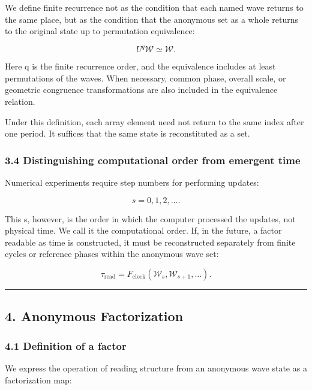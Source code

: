 \documentclass[
  a4paper,
]{article}
\begin{document}
We define finite recurrence not as the condition that each named wave
returns to the same place, but as the condition that the anonymous set
as a whole returns to the original state up to permutation equivalence:

\[
U^q\mathcal W
\simeq
\mathcal W.
\]

Here q is the finite recurrence order, and the equivalence includes at
least permutations of the waves. When necessary, common phase, overall
scale, or geometric congruence transformations are also included in the
equivalence relation.

Under this definition, each array element need not return to the same
index after one period. It suffices that the same state is reconstituted
as a set.

\subsubsection{3.4 Distinguishing computational order from emergent
time}\label{distinguishing-computational-order-from-emergent-time}

Numerical experiments require step numbers for performing updates:

\[
s=0,1,2,\ldots.
\]

This s, however, is the order in which the computer processed the
updates, not physical time. We call it the computational order. If, in
the future, a factor readable as time is constructed, it must be
reconstructed separately from finite cycles or reference phases within
the anonymous wave set:

\[
\tau_{\mathrm{read}}
=
F_{\mathrm{clock}}(\mathcal W_s,\mathcal W_{s+1},\ldots).
\]

\begin{center}\rule{0.5\linewidth}{0.5pt}\end{center}

\subsection{4. Anonymous Factorization}\label{anonymous-factorization}

\subsubsection{4.1 Definition of a factor}\label{definition-of-a-factor}

We express the operation of reading structure from an anonymous wave
state as a factorization map:
\end{document}
